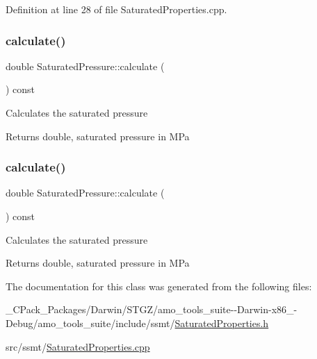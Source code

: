 Definition at line 28 of file Saturated\+Properties.\+cpp.

\mbox{\label{class_saturated_pressure_a8ef5357b4f8af1aeaa8dde6ae05b9daa}} 
\subsubsection{\texorpdfstring{calculate()}{calculate()}\hspace{0.1cm}{\footnotesize\ttfamily [2/3]}}
{\footnotesize\ttfamily double Saturated\+Pressure\+::calculate (\begin{DoxyParamCaption}{ }\end{DoxyParamCaption}) const}

Calculates the saturated pressure \begin{DoxyReturn}{Returns}
double, saturated pressure in M\+Pa 
\end{DoxyReturn}
\mbox{\label{class_saturated_pressure_a8ef5357b4f8af1aeaa8dde6ae05b9daa}} 
\subsubsection{\texorpdfstring{calculate()}{calculate()}\hspace{0.1cm}{\footnotesize\ttfamily [3/3]}}
{\footnotesize\ttfamily double Saturated\+Pressure\+::calculate (\begin{DoxyParamCaption}{ }\end{DoxyParamCaption}) const}

Calculates the saturated pressure \begin{DoxyReturn}{Returns}
double, saturated pressure in M\+Pa 
\end{DoxyReturn}


The documentation for this class was generated from the following files\+:\begin{DoxyCompactItemize}
\item 
\+\_\+\+C\+Pack\+\_\+\+Packages/\+Darwin/\+S\+T\+G\+Z/amo\+\_\+tools\+\_\+suite-\/-\/\+Darwin-\/x86\+\_-\/\+Debug/amo\+\_\+tools\+\_\+suite/include/ssmt/\hyperlink{___c_pack___packages_2_darwin_2_s_t_g_z_2amo__tools__suite--_darwin-x86__64-_debug_2amo__tools__a4aa1517d601f9c2b44ebe76c8c6d4f0}{Saturated\+Properties.\+h}\item 
src/ssmt/\hyperlink{_saturated_properties_8cpp}{Saturated\+Properties.\+cpp}\end{DoxyCompactItemize}
